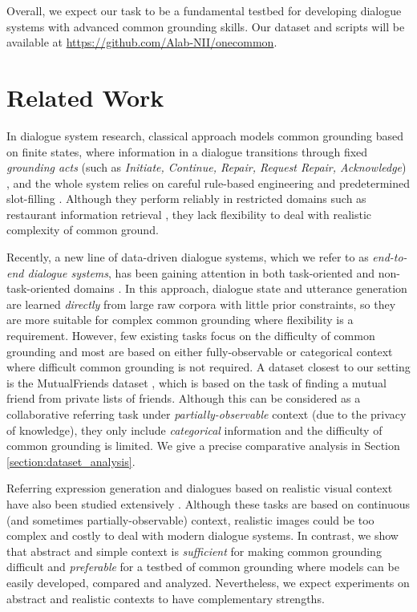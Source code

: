 \documentclass[letterpaper]{article} %
\begin{document}
Overall, we expect our task to be a fundamental testbed for developing dialogue systems with advanced common grounding skills. Our dataset and scripts will be available at \url{https://github.com/Alab-NII/onecommon}.

\section{Related Work}
\label{section:related_work}

In dialogue system research, classical approach models common grounding based on finite states, where information in a dialogue transitions through fixed \emph{grounding acts} (such as \emph{Initiate, Continue, Repair, Request Repair, Acknowledge}) \cite{traum1994computational}, and the whole system relies on careful rule-based engineering and predetermined slot-filling \cite{young2013pomdp}. Although they perform reliably in restricted domains such as restaurant information retrieval \cite{williams2016dialog}, they lack flexibility to deal with realistic complexity of common ground.

Recently, a new line of data-driven dialogue systems, which we refer to as \emph{end-to-end dialogue systems}, has been gaining attention in both task-oriented \cite{bordes2016learning,lewis2017deal} and non-task-oriented domains \cite{vinyals2015neural,serban2016hierarchical}. In this approach, dialogue state and utterance generation are learned \emph{directly} from large raw corpora with little prior constraints, so they are more suitable for complex common grounding where flexibility is a requirement. However, few existing tasks focus on the difficulty of common grounding and most are based on either fully-observable or categorical context \cite{de2017guesswhat,bordes2016learning,lewis2017deal} where difficult common grounding is not required. A dataset closest to our setting is the MutualFriends dataset \cite{he2017learning}, which is based on the task of finding a mutual friend from private lists of friends. Although this can be considered as a collaborative referring task under \emph{partially-observable} context (due to the privacy of knowledge), they only include \emph{categorical} information and the difficulty of common grounding is limited. We give a precise comparative analysis in Section \ref{section:dataset_analysis}.

Referring expression generation and dialogues based on realistic visual context have also been studied extensively \cite{kazemzadeh2014referit,das2017visual,das2017visdial_rl}. Although these tasks are based on continuous (and sometimes partially-observable) context, realistic images could be too complex and costly to deal with modern dialogue systems. In contrast, we show that abstract and simple context is \emph{sufficient} for making common grounding difficult and \emph{preferable} for a testbed of common grounding where models can be easily developed, compared and analyzed. Nevertheless, we expect experiments on abstract and realistic contexts to have complementary strengths.
\end{document}

